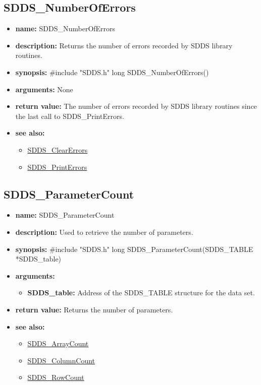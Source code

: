 \documentclass[11pt]{article}
\newcommand{\progref}[1]{\hyperref{SDDS_#1}{{\tt SDDS\_#1} (}{)}{SDDS_#1}}
\begin{document}
\subsection{SDDS\_NumberOfErrors}
\label{SDDS_NumberOfErrors}

\begin{itemize}
\item {\bf name:}\newline
SDDS\_NumberOfErrors
\item {\bf description:}\newline
Returns the number of errors recorded by SDDS library routines.
\item {\bf synopsis:} \#include "SDDS.h"\newline
long SDDS\_NumberOfErrors()
\item {\bf arguments:}\newline
None
\item {\bf return value:}\newline
The number of errors recorded by SDDS library routines since the last call to SDDS\_PrintErrors.
\item {\bf see also:}
\begin{itemize}
\item \progref{ClearErrors}
\item \progref{PrintErrors}
\end{itemize}
\end{itemize}

\subsection{SDDS\_ParameterCount}
\label{SDDS_ParameterCount}

\begin{itemize}
\item {\bf name:}\newline
SDDS\_ParameterCount
\item {\bf description:}\newline
Used to retrieve the number of parameters.
\item {\bf synopsis:} \#include "SDDS.h"\newline
long SDDS\_ParameterCount(SDDS\_TABLE *SDDS\_table)
\item {\bf arguments:}
\begin{itemize}
\item {\bf SDDS\_table:} Address of the SDDS\_TABLE structure for the data set.
\end{itemize}
\item {\bf return value:}\newline
Returns the number of parameters.
\item {\bf see also:}
\begin{itemize}
\item \progref{ArrayCount}
\item \progref{ColumnCount}
\item \progref{RowCount}
\end{itemize}
\end{itemize}
\end{document}
